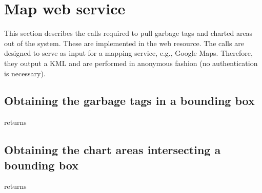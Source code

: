 \section{Map web service}
\label{sec:call:map}

This section describes the calls required to pull garbage tags and charted areas
out of the system. These are implemented in the
 web resource. The
calls are designed to serve as input for a mapping service, e.g., Google Maps.
Therefore, they output a KML and are performed in anonymous fashion (no
authentication is necessary).

\subsection{Obtaining the garbage tags in a bounding box}

\begin{apidata}{returns}
  \begin{datalist}
  \end{datalist}
\end{apidata}

\subsection{Obtaining the chart areas intersecting a bounding box}

\begin{apidata}{returns}
  \begin{datalist}
  \end{datalist}
\end{apidata}
